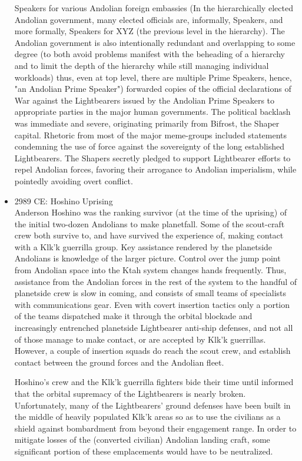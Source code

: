 \begin{itemize}
Speakers for various Andolian foreign embassies (In the hierarchically
elected Andolian government, many elected officials are, informally,
Speakers, and more formally, Speakers for XYZ (the previous level in
the hierarchy). The Andolian government is also intentionally
redundant and overlapping to some degree (to both avoid problems
manifest with the beheading of a hierarchy and to limit the depth of
the hierarchy while still managing individual workloads) thus, even at
top level, there are multiple Prime Speakers, hence, "an Andolian
Prime Speaker") forwarded copies of the official declarations of War
against the Lightbearers issued by the Andolian Prime Speakers to
appropriate parties in the major human governments. The political
backlash was immediate and severe, originating primarily from Bifrost,
the Shaper capital.  Rhetoric from most of the major meme-groups
included statements condemning the use of force against the
sovereignty of the long established Lightbearers.  The Shapers
secretly pledged to support Lightbearer efforts to repel Andolian
forces, favoring their arrogance to Andolian imperialism, while
pointedly avoiding overt conflict.

\item 2989 CE: Hoshino Uprising \\

Anderson Hoshino was the ranking survivor (at the time of the
uprising) of the initial two-dozen Andolians to make planetfall. Some
of the scout-craft crew both survive to, and have survived the
experience of, making contact with a Klk'k guerrilla group. Key
assistance rendered by the planetside Andolians is knowledge of the
larger picture. Control over the jump point from Andolian space into
the Ktah system changes hands frequently. Thus, assistance from the
Andolian forces in the rest of the system to the handful of planetside
crew is slow in coming, and consists of small teams of specialists
with communications gear. Even with covert insertion tactics only a
portion of the teams dispatched make it through the orbital blockade
and increasingly entrenched planetside Lightbearer anti-ship defenses,
and not all of those manage to make contact, or are accepted by Klk'k
guerrillas. However, a couple of insertion squads do reach the scout
crew, and establish contact between the ground forces and the Andolian
fleet.

Hoshino's crew and the Klk'k guerrilla fighters bide their time until
informed that the orbital supremacy of the Lightbearers is nearly
broken. Unfortunately, many of the Lightbearers' ground defenses have
been built in the middle of heavily populated Klk'k areas so as to
use the civilians as a shield against bombardment from beyond their
engagement range. In order to mitigate losses of the (converted
civilian) Andolian landing craft, some significant portion of these
emplacements would have to be neutralized.


\end{itemize}
